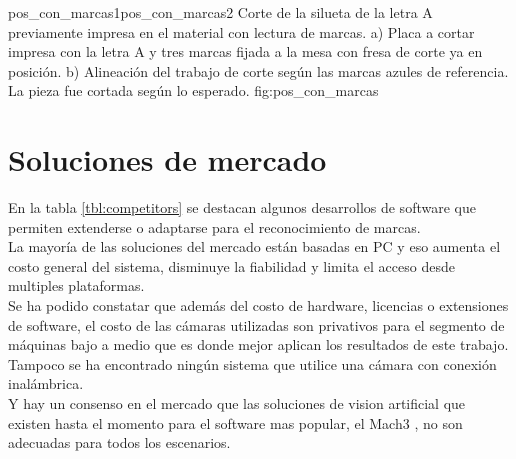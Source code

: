          {pos_con_marcas1}{pos_con_marcas2}
         {Corte de la silueta de la letra A previamente impresa en el material con lectura de marcas. a) Placa a cortar impresa con la letra A y tres marcas fijada a la mesa con fresa de corte ya en posición. b) Alineación del trabajo de corte según las marcas azules de referencia. La pieza fue cortada según lo esperado.}
         {fig:pos_con_marcas}


\section{Soluciones de mercado}

En la tabla \ref{tbl:competitors} se destacan algunos desarrollos de software que permiten extenderse o adaptarse para el reconocimiento de marcas.\\
   La mayoría de las soluciones del mercado están basadas en PC y eso aumenta el costo general del sistema, disminuye la fiabilidad y limita el acceso desde multiples plataformas.\\
   Se ha podido constatar que además del costo de hardware, licencias o extensiones de software, el costo de las cámaras utilizadas son privativos para el segmento de máquinas bajo a medio que es donde mejor aplican los resultados de este trabajo.\\
   Tampoco se ha encontrado ningún sistema que utilice una cámara con conexión inalámbrica.\\ 
   Y hay un consenso en el mercado que las soluciones de vision artificial que existen hasta el momento para el software mas popular, el Mach3 \citep{WEBSITE:mach3}, no son adecuadas para todos los escenarios.
   
